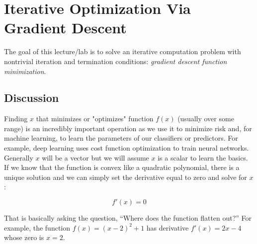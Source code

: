 \documentclass[titlepage]{tufte-book}
\newcounter{problem}
\begin{document}
\chapter{Iterative Optimization Via Gradient Descent}

\begin{fullwidth}

The goal of this lecture/lab is to solve an iterative computation problem with nontrivial iteration and termination conditions: {\em gradient descent function minimization}. 

\section{Discussion}

Finding $x$ that minimizes or "optimizes" function $f(x)$ (usually over some range) is an incredibly important operation as we use it to minimize risk and, for machine learning, to learn the parameters of our classifiers or predictors. For example, deep learning uses cost function optimization to train neural networks. Generally $x$ will be a vector but we will assume $x$ is a scalar to learn the basics. If we know that the function is convex like a quadratic polynomial, there is a unique solution and we can simply set the derivative equal to zero and solve for $x$:

\[\tag{Analytic solution to optimization}
f'(x) = 0
\]

\noindent That is basically asking the question, ``Where does the function flatten out?''  For example, the function $f(x) = (x-2)^2 + 1$ has derivative $f'(x) = 2x - 4$ whose zero is $x=2$.

\begin{center}
\end{center}


\end{fullwidth}
\end{document}
